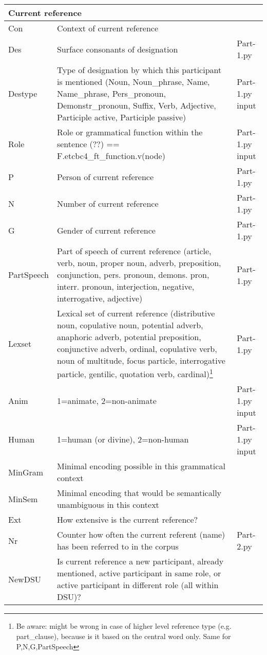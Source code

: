 \documentclass{article}
\begin{document}
\begin{longtable}{|l|p{}|l|}
\multicolumn{3}{|l|}{\bf{Current reference}} \\ \hline

Con & Context of current reference & \\ \hline
Des & Surface consonants of designation & Part-1.py \\ \hline
Destype & Type of designation by which this participant is mentioned (Noun, Noun\_phrase, Name, Name\_phrase, Pers\_pronoun, Demonstr\_pronoun,  Suffix, Verb, Adjective, Participle active, Participle passive) & Part-1.py input \\ \hline
Role & Role or grammatical function within the sentence (??) == F.etcbc4\_ft\_function.v(node) & Part-1.py input\\ \hline
P & Person of current reference & Part-1.py \\ \hline
N & Number of current reference & Part-1.py \\ \hline
G & Gender of current reference & Part-1.py \\ \hline
PartSpeech & Part of speech of current reference (article, verb, noun, proper noun, adverb, preposition, conjunction, pers. pronoun, demons. pron, interr. pronoun, interjection, negative, interrogative, adjective) & Part-1.py \\ \hline
Lexset & Lexical set of current reference (distributive noun, copulative noun, potential adverb, anaphoric adverb, potential preposition, conjunctive adverb, ordinal, copulative verb, noun of multitude, focus particle, interrogative particle, gentilic, quotation verb, cardinal)\footnote{Be aware: might be wrong in case of higher level reference type (e.g. part\_clause), because is it based on the central word only. Same for P,N,G,PartSpeech} & Part-1.py \\ \hline
Anim & 1=animate, 2=non-animate & Part-1.py input \\ \hline
Human & 1=human (or divine), 2=non-human & Part-1.py input \\ \hline
MinGram & Minimal encoding possible in this grammatical context & \\ \hline
MinSem & Minimal encoding that would be semantically unambiguous in this context & \\ \hline
Ext & How extensive is the current reference? & \\ \hline
Nr & Counter how often the current referent (name) has been referred to in the corpus & Part-2.py \\ \hline
NewDSU & Is current reference a new participant, already mentioned, active participant in same role, or active participant in different role (all within DSU)?  & \\ \hline

\end{longtable}
\end{document}
